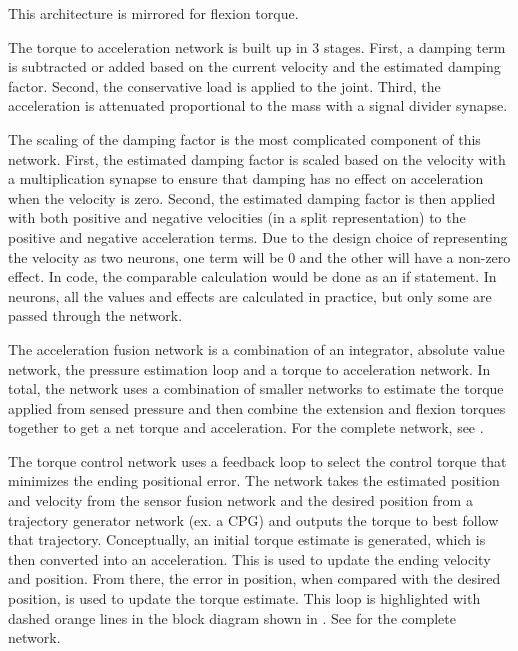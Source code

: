 This architecture is mirrored for flexion torque.

\label{sec:torque2accel}

The torque to acceleration network is built up in 3 stages. First, a damping 
term is subtracted or added based on the current velocity and the estimated
damping factor. Second, the conservative load is applied to the joint. Third,
the acceleration is attenuated proportional to the mass with a signal divider
synapse.

The scaling of the damping factor is the most complicated component of this
network. First, the estimated damping factor is scaled based on the velocity 
with a multiplication synapse to ensure that damping has no effect on acceleration
when the velocity is zero. Second, the estimated damping factor is then applied with both positive and
negative velocities (in a split representation) to the positive and negative
acceleration terms. Due to the design choice of representing the velocity as two
neurons, one term will be 0 and the other will have a 
non-zero effect. In code, the comparable calculation would be done as an if statement. In neurons,
all the values and effects are calculated in practice, but only some are passed
through the network.


The acceleration fusion network is a combination of an integrator, absolute
value network, the pressure estimation loop and a torque to acceleration
network. In total, the network uses a combination of smaller networks to
estimate the torque applied from sensed pressure and then combine the extension
and flexion torques together to get a net torque and acceleration. For the complete network, see .


The torque control network uses a feedback loop to select the
control torque that minimizes the ending positional error. The network takes the estimated position and velocity from the 
sensor fusion network and the desired position from a trajectory generator
network (ex. a CPG) and outputs the torque to best follow that trajectory. Conceptually, an initial torque estimate is generated, which is then converted into an acceleration. This is used to update the ending velocity and position. From there, the error in position, when compared with the desired position, is used to update the torque estimate. This loop is highlighted with dashed orange lines in the block diagram shown in .
See  for the complete network.

